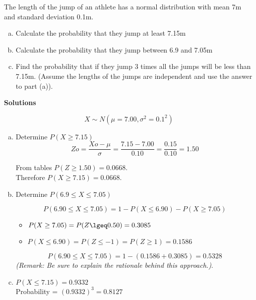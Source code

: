 \documentclass[a4paper,12pt]{article}
\begin{document}
\large 
\noindent The length of the jump of an athlete has a normal distribution with mean 7m and standard deviation 0.1m. 



\begin{enumerate}[(a)]
	\item 
	Calculate the probability that they jump  at least 7.15m
	
\item 
	Calculate the probability that they jump  between 6.9 and 7.05m
	
\item 
	Find the probability that if they jump  3 times all the jumps will be less than 7.15m. (Assume the lengths of the jumps are independent and use the answer to part (a)).  
	
\end{enumerate}

\noindent \textbf{Solutions}

\[ X \sim N(\mu = 7.00,  \sigma^2 = 0.1^2 )\]


\begin{enumerate}[(a)]
    \item Determine $P(X \geq 7.15) $               
\[Zo=\frac{Xo-\mu}{\sigma} = \frac{7.15 - 7.00}{0.10}=\frac{0.15}{0.10}=1.50\]

From tables $P(Z\geq 1.50) = 0.0668$. \\    \smallskip     
Therefore $P(X\geq 7.15) = 0.0668$.

\bigskip
\item Determine $P(6.9\leq X \leq 7.05)$


\[P(6.90 \leq X \leq 7.05) = 1 - P(X\leq 6.90 ) - P(X \geq 7.05 )\]
\medskip
\begin{itemize}
\item $P(X\geq 7.05 ) = P(Z \lgeq 0.50 ) = 0.3085 $  
\smallskip
\item $P(X\leq 6.90 ) = P(Z \leq -1 )= P(Z \geq 1 ) = 0.1586$
\end{itemize}
\medskip
\[P(6.90 \leq X \leq 7.05) = 1 - (0.1586 + 0.3085) = 0.5328\]      
\noindent \textit{(Remark: Be sure to explain the rationale behind this approach.)}.
\item             
$P(X\leq 7.15) = 0.9332$\\        \medskip
Probability = $(0.9332)^3= 0.8127$

\end{enumerate}
\end{document}
